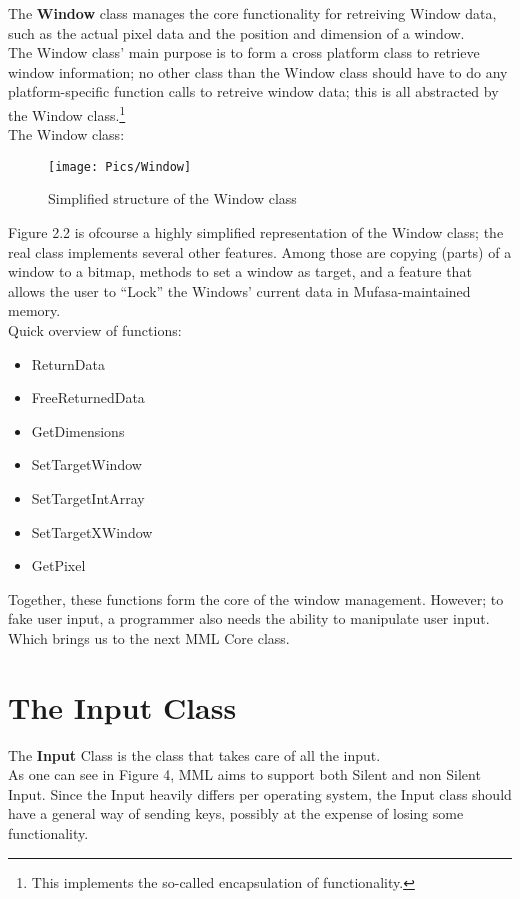 \documentclass[a4paper, 10pt]{report} %
\begin{document}
The \textbf{Window} class manages the core functionality for retreiving Window data,
such as the actual pixel data and the position and dimension of a window. \\

The Window class' main purpose is to form a cross platform class to retrieve
window information; no other class than the Window class should have to do
any platform-specific function calls to retreive window data; this is all
abstracted by the Window class.\footnote{This implements the so-called 
encapsulation of functionality.} \\

The Window class:

\begin{figure}[ht]
	\texttt{[image: Pics/Window]}
	\caption{Simplified structure of the Window class}
\end{figure}

Figure 2.2 is ofcourse a highly simplified representation of the Window class;
the real class implements several other features. Among those are copying
(parts) of a window to a bitmap, methods to set a window as target, and
a feature that allows the user to ``Lock'' the Windows' current data in
Mufasa-maintained memory. \\

Quick overview of functions:

\begin{itemize}
	\item ReturnData
	\item FreeReturnedData
	\item GetDimensions
	\item SetTargetWindow
	\item SetTargetIntArray
	\item SetTargetXWindow
	\item GetPixel
\end{itemize}

Together, these functions form the core of the window management.
However; to fake user input, a programmer also needs the ability to 
manipulate user input. Which brings us to the next MML Core class.

\section{The Input Class}

The \textbf{Input} Class is the class that takes care of all the input. \\
As one can see in Figure 4, MML aims to support both Silent and non Silent 
Input. Since the Input heavily differs per operating system, 
the Input class should have a general way of sending keys,
possibly at the expense of losing some functionality.
\end{document}
